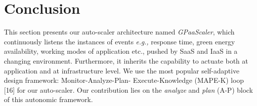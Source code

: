 \section{Conclusion}

This section presents our auto-scaler architecture named \emph{GPaaScaler}, which continuously listens the instances of events \emph{e.g.,} response time, green energy availability, working modes of application etc., pushed by SaaS and IaaS in a changing environment. Furthermore, it inherits the capability to actuate both at application and at infrastructure level.
We use the most popular self-adaptive design framework: Monitor-Analyze-Plan-
Execute-Knowledge (MAPE-K) loop [16] for our auto-scaler.
Our contribution lies on the \emph{analyze} and \emph{plan} (A-P) block of this autonomic framework.

